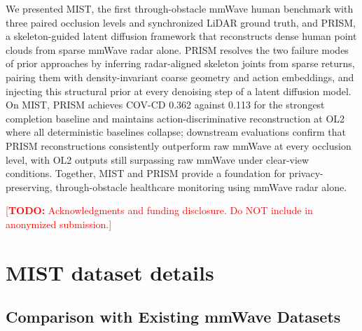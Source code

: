 \documentclass{article}
\newcommand{\todo}[1]{\textcolor{red}{[\textbf{TODO:} #1]}}
\begin{document}
We presented MIST, the first through-obstacle mmWave human benchmark with three
paired occlusion levels and synchronized LiDAR ground truth, and PRISM, a
skeleton-guided latent diffusion framework that reconstructs dense human point
clouds from sparse mmWave radar alone.
PRISM resolves the two failure modes of prior approaches by inferring radar-aligned
skeleton joints from sparse returns, pairing them with density-invariant coarse
geometry and action embeddings, and injecting this structural prior at every
denoising step of a latent diffusion model.
On MIST, PRISM achieves COV-CD 0.362 against 0.113 for the strongest completion
baseline and maintains action-discriminative reconstruction at OL2 where all
deterministic baselines collapse; downstream evaluations confirm that PRISM
reconstructions consistently outperform raw mmWave at every occlusion level, with
OL2 outputs still surpassing raw mmWave under clear-view conditions.
Together, MIST and PRISM provide a foundation for privacy-preserving,
through-obstacle healthcare monitoring using mmWave radar alone.

\begin{ack}
\todo{Acknowledgments and funding disclosure. Do NOT include in anonymized submission.}
\end{ack}




\newpage


\appendix

\section{MIST dataset details}
\label{app:mist}

\subsection{Comparison with Existing mmWave Datasets}
\label{app:mist_compare}
\end{document}
